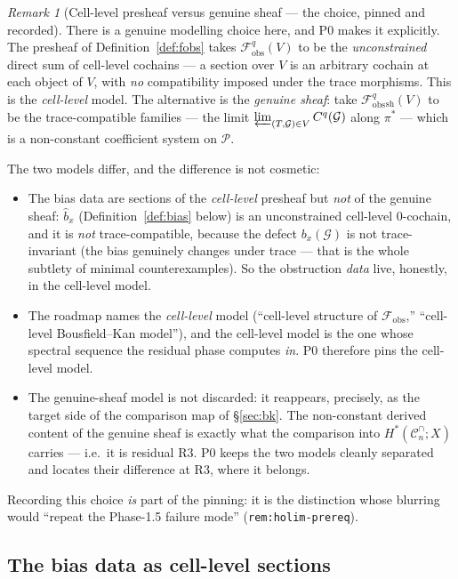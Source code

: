 \documentclass[11pt,oneside]{amsart}
\theoremstyle{plain}
\theoremstyle{definition}
\theoremstyle{remark}
\newtheorem{remark}[theorem]{Remark}
\theoremstyle{honeststyle}
\newcommand{\G}{\mathcal{G}}
\newcommand{\Cn}{\mathcal{C}^{\cap}_n}
\newcommand{\fobs}{\mathcal{F}_{\mathrm{obs}}}
\newcommand{\Pp}{\mathcal{P}}
\begin{document}
\begin{remark}[Cell-level presheaf versus genuine sheaf --- the
choice, pinned and recorded]
\label{rem:presheaf-vs-sheaf}
There is a genuine modelling choice here, and P0 makes it explicitly.
The presheaf of Definition~\ref{def:fobs} takes $\fobs^{q}(V)$ to be
the \emph{unconstrained} direct sum of cell-level cochains --- a
section over $V$ is an arbitrary cochain at each object of $V$, with
\emph{no} compatibility imposed under the trace morphisms. This is the
\emph{cell-level} model. The alternative is the \emph{genuine sheaf}:
take $\fobs^{q}_{\mathrm{sh}}(V)$ to be the trace-compatible families
--- the limit $\varprojlim_{(T,\G)\in V}C^{q}(\G)$ along $\pi^{*}$ ---
which is a non-constant coefficient system on $\Pp$.

The two models differ, and the difference is not cosmetic:
\begin{itemize}[leftmargin=1.5em]
\item The bias data are sections of the \emph{cell-level} presheaf
  but \emph{not} of the genuine sheaf: $\widehat b_{x}$
  (Definition~\ref{def:bias} below) is an unconstrained cell-level
  $0$-cochain, and it is \emph{not} trace-compatible, because the
  defect $b_{x}(\G)$ is not trace-invariant (the bias genuinely
  changes under trace --- that is the whole subtlety of minimal
  counterexamples). So the obstruction \emph{data} live, honestly, in
  the cell-level model.
\item The roadmap names the \emph{cell-level} model
  (``cell-level structure of $\fobs$,'' ``cell-level Bousfield--Kan
  model''), and the cell-level model is the one whose spectral
  sequence the residual phase computes \emph{in}. P0 therefore pins
  the cell-level model.
\item The genuine-sheaf model is not discarded: it reappears,
  precisely, as the target side of the comparison map of
  \S\ref{sec:bk}. The non-constant derived content of the genuine
  sheaf is exactly what the comparison into $H^{*}(\Cn;X)$ carries ---
  i.e.\ it is residual R3. P0 keeps the two models cleanly separated
  and locates their difference at R3, where it belongs.
\end{itemize}
Recording this choice \emph{is} part of the pinning: it is the
distinction whose blurring would ``repeat the Phase-1.5 failure mode''
(\texttt{rem:holim-prereq}).
\end{remark}

\subsection{The bias data as cell-level sections}
\label{ssec:bias}
\end{document}
